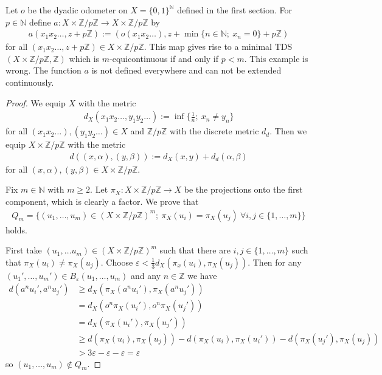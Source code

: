 \begin{example}
	Let $o$ be the dyadic odometer on $X = \{0, 1\}^\mathbb{N}$ defined in the first section. For $p \in \mathbb{N}$ define $a: X \times \mathbb{Z}/p\mathbb{Z} \to X \times \mathbb{Z}/p\mathbb{Z}$ by
	\begin{align*}
		a(x_1x_2\dots, z + p\mathbb{Z}) := (o(x_1x_2\dots), z + \min \{n \in \mathbb{N};\ x_n = 0\} + p\mathbb{Z})
	\end{align*}
	for all $(x_1x_2\dots, z + p\mathbb{Z}) \in X \times \mathbb{Z}/p\mathbb{Z}$. This map gives rise to a minimal TDS $(X \times \mathbb{Z}/p\mathbb{Z}, \mathbb{Z})$ which is $m$-equicontinuous if and only if $p < m$. \color{red} This example is wrong. The function $a$ is not defined everywhere and can not be extended continuously.
\end{example}
\begin{proof}
	We equip $X$ with the metric
	\begin{align*}
		d_X(x_1x_2\dots, y_1y_2\dots) := \inf\{\frac{1}{n};\ x_n \neq y_n\}
	\end{align*}
	for all $(x_1x_2\dots), (y_1y_2\dots) \in X$ and $\mathbb{Z}/p\mathbb{Z}$ with the discrete metric $d_d$. Then we equip $X \times \mathbb{Z}/p\mathbb{Z}$ with the metric
	\begin{align*}
		d((x, \alpha), (y, \beta)) := d_X(x, y) + d_d(\alpha, \beta)
	\end{align*}
	for all $(x, \alpha), (y, \beta) \in X \times \mathbb{Z}/p\mathbb{Z}$.
	
	Fix $m \in \mathbb{N}$ with $m \geq 2$. Let $\pi_X: X \times \mathbb{Z}/p\mathbb{Z} \to X$ be the projections onto the first component, which is clearly a factor. We prove that
	\begin{align*}
		Q_m = \{(u_1, \dots, u_m) \in (X \times \mathbb{Z}/p\mathbb{Z})^m;\ \pi_X(u_i) = \pi_X(u_j)\ \forall i, j \in \{1, \dots, m\}\}
	\end{align*}
	holds.
	
	First take $(u_1, \dots u_m) \in (X \times \mathbb{Z}/p\mathbb{Z})^m$ such that there are $i, j \in \{1, \dots, m\}$ such that $\pi_X(u_i) \neq \pi_X(u_j)$. Choose $\varepsilon < \frac{1}{3} d_X(\pi_x(u_i), \pi_X(u_j))$. Then for any $(u_1', \dots, u_m') \in B_\varepsilon(u_1, \dots, u_m)$ and any $n \in \mathbb{Z}$ we have
	\begin{align*}
		d(a^nu_i', a^nu_j') &\geq d_X(\pi_X(a^nu_i'), \pi_X(a^nu_j'))\\
		&= d_X(o^n\pi_X(u_i'), o^n\pi_X(u_j'))\\
		&= d_X(\pi_X(u_i'), \pi_X(u_j'))\\
		&\geq d(\pi_X(u_i), \pi_X(u_j)) - d(\pi_X(u_i), \pi_X(u_i')) - d(\pi_X(u_j'), \pi_X(u_j))\\
		&> 3\varepsilon - \varepsilon - \varepsilon = \varepsilon
	\end{align*}
	so $(u_1, \dots, u_m) \notin Q_m$.
	

\end{proof}
